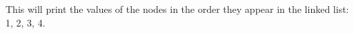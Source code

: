 \documentclass[preview]{standalone}
\begin{document}
This will print the values of the nodes in the order they appear in the linked list: 1, 2, 3, 4.\\
\end{document}
